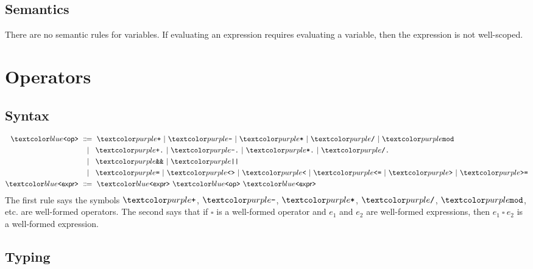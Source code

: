 \subsection*{Semantics}

There are no semantic rules for variables.  If evaluating an
expression requires evaluating a variable, then the expression is not
well-scoped.

\section{Operators}

\subsection*{Syntax}

\begin{align*}
  \bnfnt{op} &\bnfeq \bnft + \bnfalt \bnft - \bnfalt \bnft * \bnfalt \bnft / \bnfalt \bnft{mod} \\
  &\bnfaltn \bnft {+.} \bnfalt \bnft {-.} \bnfalt \bnft {*.} \bnfalt \bnft {/.} \\
  &\bnfaltn \bnft {\&\&} \bnfalt \bnft {||} \\
  &\bnfaltn \bnft {=} \bnfalt \bnft {<>} \bnfalt \bnft {<} \bnfalt \bnft {<=} \bnfalt \bnft {>} \bnfalt \bnft {>=} \\
  \bnfnt{expr} &\bnfeq \bnfnt{expr} \ \bnfnt{op} \ \bnfnt{expr}
\end{align*}
The first rule says the symbols $\codel{+}$, $\codel-$, $\codel *$,
$\codel/$, $\codel{mod}$, etc. are well-formed operators.  The second
says that if $\square$ is a well-formed operator and $e_1$ and $e_2$
are well-formed expressions, then $e_1 \ \square \ e_2$ is a
well-formed expression.

\subsection*{Typing}

